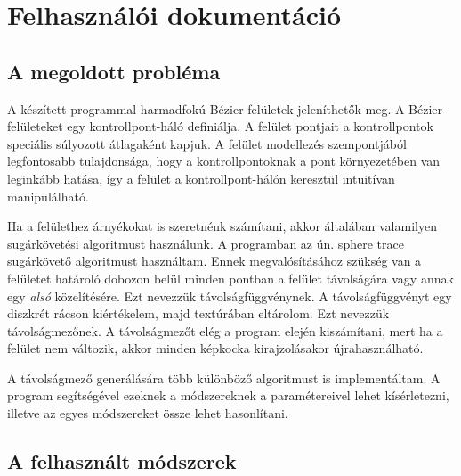 \chapter{Felhasználói dokumentáció}
\label{ch:user}

\section{A megoldott probléma}

A készített programmal harmadfokú Bézier-felületek jeleníthetők meg. A Bézier-felületeket egy kontrollpont-háló definiálja. A felület pontjait a kontrollpontok speciális súlyozott átlagaként kapjuk. A felület modellezés szempontjából legfontosabb tulajdonsága, hogy a kontrollpontoknak a pont környezetében van leginkább hatása, így a felület a kontrollpont-hálón keresztül intuitívan manipulálható.

Ha a felülethez árnyékokat is szeretnénk számítani, akkor általában valamilyen sugárkövetési algoritmust használunk. A programban az ún. sphere trace sugárkövető algoritmust használtam. Ennek megvalósításához szükség van a felületet határoló dobozon belül minden pontban a felület távolságára vagy annak egy \emph{alsó} közelítésére. Ezt nevezzük távolságfüggvénynek. A távolságfüggvényt egy diszkrét rácson kiértékelem, majd textúrában eltárolom. Ezt nevezzük távolságmezőnek. A távolságmezőt elég a program elején kiszámítani, mert ha a felület nem változik, akkor minden képkocka kirajzolásakor újrahasználható.

A távolságmező generálására több különböző algoritmust is implementáltam. A program segítségével ezeknek a módszereknek a paramétereivel lehet kísérletezni, illetve az egyes módszereket össze lehet hasonlítani.


\section{A felhasznált módszerek}

